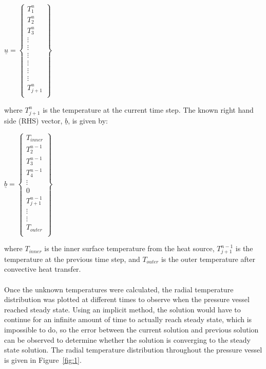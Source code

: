 \documentclass[times]{nmeauth}
\begin{document}
\begin{center}
$\underline{u}=			
					\left\{ \begin{matrix}
					   T_{1}^{n}  \\
					   T_{2}^{n}  \\
					   T_{3}^{n}  \\
					   \vdots   \\
					   \vdots   \\
					   \vdots   \\
					   \vdots   \\
					   \vdots   \\
					   \vdots   \\
					   T_{j+1}^{n}  \\
					\end{matrix} \right\}$									
\end{center}
where $T_{j+1}^{n}$ is the temperature at the current time step. The known right hand side (RHS) vector, $\underline{b}$, is given by:
\begin{center}
$\underline{b}=			
					\left\{ \begin{matrix}
					   {{T}_{inner}}  \\
					   T_{2}^{n-1}  \\
					   T_{3}^{n-1}  \\
					   T_{4}^{n-1}  \\
					   \vdots   \\
					   0  \\
					   T_{j+1}^{n-1}  \\
					   \vdots   \\
					   \vdots   \\
					   {{T}_{outer}}  \\
					\end{matrix} \right\}$					
\end{center}
where ${{T}_{inner}}$ is the inner surface temperature from the heat source, $T_{j+1}^{n-1}$ is the temperature at the previous time step, and ${{T}_{outer}}$ is the outer temperature after convective heat transfer.\\\\
Once the unknown temperatures were calculated, the radial temperature distribution was plotted at different times to observe when the pressure vessel reached steady state. Using an implicit method, the solution would have to continue for an infinite amount of time to actually reach steady state, which is impossible to do, so the error between the current solution and previous solution can be observed to determine whether the solution is converging to the steady state solution. The radial temperature distribution throughout the pressure vessel is given in Figure~\ref{fig:1}.
\end{document}
